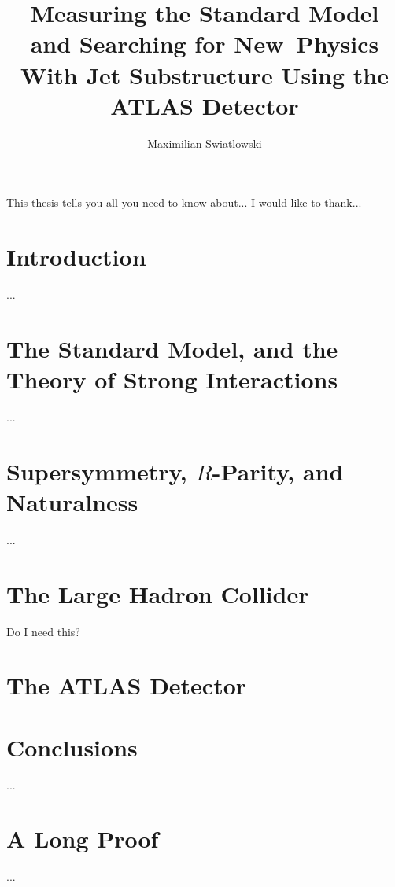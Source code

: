 \documentclass{report}
\begin{document}
\title{Measuring the Standard Model and Searching for New~Physics 
        With Jet Substructure Using the ATLAS Detector}
\author{Maximilian Swiatlowski}
 
\beforepreface
{}
    This thesis tells you all you need to know about...
    I would like to thank...
\afterpreface
 
\chapter{Introduction}
         ...

\chapter{The Standard Model, and the Theory of Strong Interactions}
		 ...

\chapter{Supersymmetry, $R$-Parity, and Naturalness}
		 ...

\chapter{The Large Hadron Collider}
		 Do I need this?

\chapter{The ATLAS Detector}





\chapter{Conclusions}
         ...
\appendix
\chapter{A Long Proof}
         ...
%
%
\end{document}
